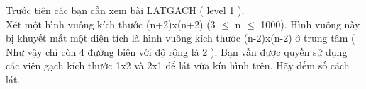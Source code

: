 Trước tiên các bạn cần xem bài LATGACH ( level 1 ).   
\\   Xét một hình vuông kích thước (n+2)x(n+2) (3 $\le$ n $\le$ 1000). Hình vuông này bị khuyết mất một diện tích là hình vuông kích thước (n-2)x(n-2) ở trung tâm ( Như vậy chỉ còn 4 đường biên với độ rộng là 2 ). Bạn vẫn được quyền sử dụng các viên gạch kích thước 1x2 và 2x1 để lát vừa kín hình trên. Hãy đếm số cách lát.